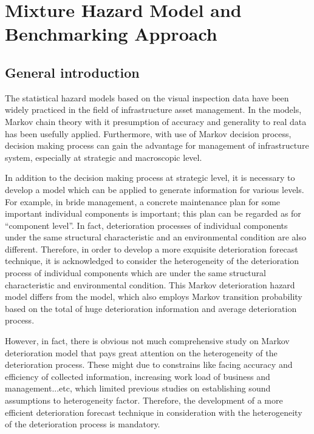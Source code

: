 
\chapter{Mixture Hazard Model and Benchmarking Approach} %
\label{Chapter6}
%
\section{General introduction}
\label{61}
The statistical hazard models based on the visual inspection data have been widely practiced in the field of infrastructure asset management. In the models, Markov chain theory with it presumption of accuracy and generality to real data has been usefully applied. Furthermore, with use of Markov decision process, decision making process can gain the advantage for management of infrastructure system, especially at strategic and macroscopic level.
 
In addition to the decision making process at strategic level, it is necessary to develop a model which can be applied to generate information for various levels. For example, in bride management, a concrete maintenance plan for some important individual components is important; this plan can be regarded as for ``component level''. In fact, deterioration processes of individual components under the same structural characteristic and an environmental condition are also different. Therefore, in order to develop a more exquisite deterioration forecast technique, it is acknowledged to consider the heterogeneity of the deterioration process of individual components which are under the same structural characteristic and environmental condition. This Markov deterioration hazard model differs from the model, which also employs Markov transition probability based on the total of huge deterioration information and average deterioration process.

However, in fact, there is obvious not much comprehensive study on Markov deterioration model that pays great attention on the heterogeneity of the deterioration process. These might due to constrains like facing accuracy and efficiency of collected information, increasing work load of business and management...etc, which limited previous studies on establishing sound assumptions to heterogeneity factor. Therefore, the development of a more efficient deterioration forecast technique in consideration with the heterogeneity of the deterioration process is mandatory.

